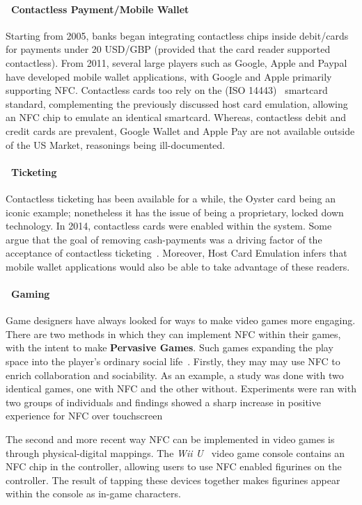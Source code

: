 \paragraph{\textbullet~Contactless Payment/Mobile Wallet}
Starting from 2005, banks began integrating contactless chips inside debit/cards for payments under 20 USD/GBP (provided that the card reader supported contactless). From 2011, several large players such as Google, Apple and Paypal have developed mobile wallet applications, with Google and Apple primarily supporting NFC. Contactless cards too rely on the (ISO 14443)~\cite{iso14443} smartcard standard, complementing the previously discussed host card emulation, allowing an NFC chip to emulate an identical smartcard. Whereas, contactless debit and credit cards are prevalent, Google Wallet and Apple Pay are not available outside of the US Market, reasonings being ill-documented.
\paragraph{\textbullet~Ticketing}
Contactless ticketing has been available for a while, the Oyster card\cite{oystercosts} being an iconic example; nonetheless it has the issue of being a proprietary, locked down technology. In 2014, contactless cards were enabled within the system. Some argue that the goal of removing cash-payments was a driving factor of the acceptance of contactless ticketing~\cite{oystercosts}. Moreover, Host Card Emulation infers that mobile wallet applications would also be able to take advantage of these readers.
\paragraph{\textbullet~Gaming}
Game designers have always looked for ways to make video games more engaging. There are two methods in which they can implement NFC within their games, with the intent to make \textbf{Pervasive Games}. Such games expanding the play space into the player's ordinary social life~\cite{montola2005exploring}. Firstly, they may may use NFC to enrich collaboration and sociability. As an example, a study was done with two identical games, one with NFC and the other without\cite{wolbert2013evaluating}. Experiments were ran with two groups of individuals and findings showed a sharp increase in positive experience for NFC over touchscreen~\cite{wolbert2013evaluating} 

The second and more recent way NFC can be implemented in video games is through physical-digital mappings. The \emph{Wii U}~\cite{nintendo} video game console contains an NFC chip in the controller, allowing users to use NFC enabled figurines on the controller. The result of tapping these devices together makes figurines appear within the console as in-game characters. 

